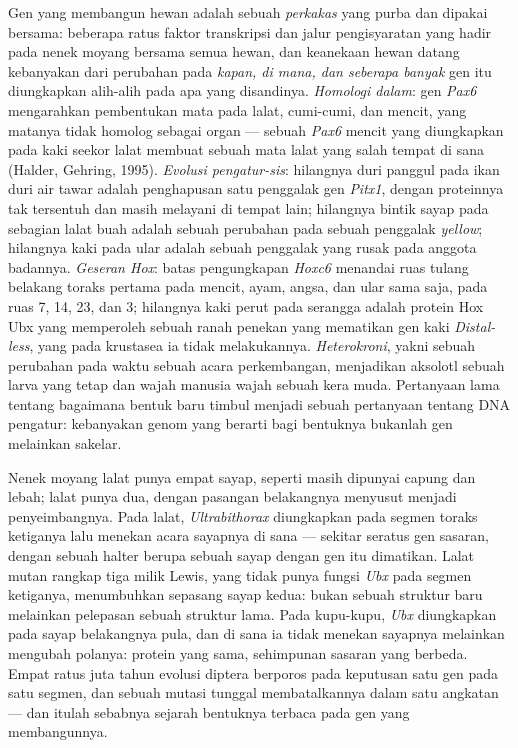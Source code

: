 \begin{definition}\label{def:b3:developmental-genetics:evodevo}
%
Gen yang membangun hewan adalah sebuah \emph{perkakas} yang purba dan dipakai bersama:
beberapa ratus faktor transkripsi dan jalur pengisyaratan yang hadir
pada nenek moyang bersama semua hewan, dan keanekaan hewan datang
kebanyakan dari perubahan pada \emph{kapan, di mana, dan seberapa banyak} gen itu
diungkapkan alih-alih pada apa yang disandinya. \emph{Homologi dalam}: gen
\emph{Pax6} mengarahkan pembentukan mata pada lalat, cumi-cumi, dan mencit, yang
matanya tidak homolog sebagai organ --- sebuah \emph{Pax6} mencit yang diungkapkan pada
kaki seekor lalat membuat sebuah mata lalat yang salah tempat di sana (Halder, Gehring, 1995).
\emph{Evolusi pengatur-sis}: hilangnya duri panggul pada
ikan duri air tawar adalah penghapusan satu penggalak gen
\emph{Pitx1}, dengan proteinnya tak tersentuh dan masih melayani di tempat lain;
hilangnya bintik sayap pada sebagian lalat buah adalah sebuah perubahan pada sebuah penggalak
\emph{yellow}; hilangnya kaki pada ular adalah sebuah penggalak
\emph{} yang rusak pada anggota badannya. \emph{Geseran Hox}: batas
pengungkapan \emph{Hoxc6} menandai ruas tulang belakang toraks pertama pada mencit,
ayam, angsa, dan ular sama saja, pada ruas 7, 14, 23, dan 3; hilangnya
kaki perut pada serangga adalah protein Hox Ubx yang memperoleh sebuah ranah penekan
yang mematikan gen kaki \emph{Distal-less}, yang pada krustasea ia tidak
melakukannya. \emph{Heterokroni}, yakni sebuah perubahan pada waktu sebuah
acara perkembangan, menjadikan aksolotl sebuah larva yang tetap dan wajah
manusia wajah sebuah kera muda. Pertanyaan lama tentang bagaimana bentuk baru timbul
menjadi sebuah pertanyaan tentang DNA pengatur: kebanyakan genom yang
berarti bagi bentuknya bukanlah gen melainkan sakelar.
\end{definition}

\begin{example}\label{ex:b3:developmental-genetics:four-wings}
Nenek moyang lalat punya empat sayap, seperti masih dipunyai capung dan lebah;
lalat punya dua, dengan pasangan belakangnya menyusut menjadi penyeimbangnya. Pada lalat,
\emph{Ultrabithorax} diungkapkan pada segmen toraks ketiganya lalu
menekan acara sayapnya di sana --- sekitar seratus gen sasaran, dengan sebuah
halter berupa sebuah sayap dengan gen itu dimatikan. Lalat mutan rangkap tiga milik Lewis,
yang tidak punya fungsi \emph{Ubx} pada segmen ketiganya,
menumbuhkan sepasang sayap kedua: bukan sebuah struktur baru melainkan pelepasan
sebuah struktur lama. Pada kupu-kupu, \emph{Ubx} diungkapkan pada sayap belakangnya pula,
dan di sana ia tidak menekan sayapnya melainkan mengubah polanya:
protein yang sama, sehimpunan sasaran yang berbeda. Empat ratus juta
tahun evolusi diptera berporos pada keputusan satu gen pada satu
segmen, dan sebuah mutasi tunggal membatalkannya dalam satu angkatan --- dan itulah
sebabnya sejarah bentuknya terbaca pada gen yang membangunnya.
\end{example}

